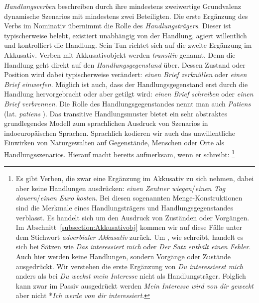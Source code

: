 \textit{Handlungsverben} beschreiben durch ihre mindestens zweiwertige Grundvalenz dynamische Szenarios mit mindestens zwei Beteiligten. Die erste Ergänzung des Verbs im Nominativ übernimmt die Rolle des \textit{Handlungsträgers}. Dieser ist typischerweise belebt, existiert unabhängig von der Handlung, agiert willentlich und kontrolliert die Handlung. Sein Tun richtet sich auf die zweite Ergänzung im Akkusativ. Verben mit Akkusativobjekt werden \textit{transitiv} genannt. Denn die Handlung geht direkt auf den \textit{Handlungsgegenstand} über. Dessen Zustand oder Position wird dabei typischerweise verändert: \textit{einen Brief zerknüllen} oder \textit{einen Brief einwerfen}. Möglich ist auch, dass der Handlungsgegenstand erst durch die Handlung hervorgebracht oder aber getilgt wird: \zB \textit{einen Brief schreiben} oder \textit{einen Brief verbrennen}. Die Rolle des Handlungsgegenstandes nennt man auch \textit{Patiens} (lat. \textit{patiens} ). Das transitive Handlungsmuster bietet ein sehr abstraktes grundlegendes Modell zum sprachlichen Ausdruck von Szenarios in indoeuropäischen Sprachen. Sprachlich kodieren wir auch das unwillentliche Einwirken von Naturgewalten auf Gegenstände, Menschen oder Orte als Handlungsszenarios. Hierauf macht bereits \citet[239]{Buehler1934} aufmerksam, wenn er schreibt: \footnote{Es gibt Verben, die zwar eine Ergänzung im Akkusativ zu sich nehmen, dabei aber keine Handlungen ausdrücken: \textit{einen Zentner wiegen}/\textit{einen Tag dauern}/\textit{einen Euro kosten}. Bei diesen sogenannten Menge-Konstruktionen sind die Merkmale eines Handlungsträgers und Handlungsgegenstandes verblasst. Es handelt sich um den Ausdruck von Zuständen oder Vorgängen. Im Abschnitt~\ref{subsection:Akkusativobj} kommen wir auf diese Fälle unter dem Stichwort \textit{adverbialer Akkusativ} zurück. Um , wie \citet[150]{Welke2019} schreibt, handelt es sich bei Sätzen wie \textit{Das interessiert mich} oder \textit{Der Satz enthält einen Fehler}. Auch hier werden keine Handlungen, sondern Vorgänge oder Zustände ausgedrückt. Wir verstehen die erste Ergänzung von \textit{Du interessierst mich} anders als bei \textit{Du weckst mein Interesse} nicht als Handlungsträger. Folglich kann zwar im Passiv ausgedrückt werden \textit{Mein Interesse wird von dir geweckt} aber nicht *\textit{Ich werde von dir interessiert}.}
